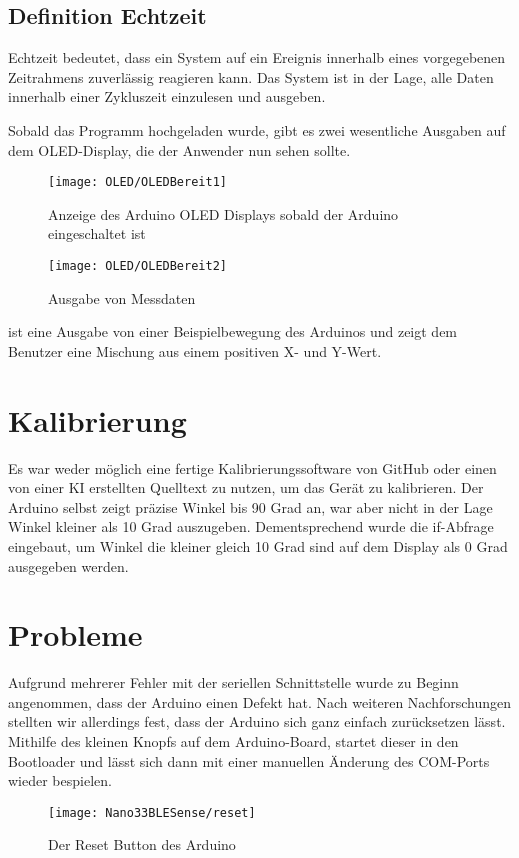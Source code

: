 \subsection{Definition Echtzeit}
\label{Echtzeit}
Echtzeit bedeutet, dass ein System auf ein Ereignis innerhalb eines vorgegebenen Zeitrahmens zuverlässig reagieren kann. Das System ist in der Lage, alle Daten innerhalb einer Zykluszeit einzulesen und ausgeben. \cite{Scholz:2005}


Sobald das Programm hochgeladen wurde, gibt es zwei wesentliche Ausgaben auf dem OLED-Display, die der Anwender nun sehen sollte.

\begin{figure}[H]
    \centering
    \texttt{[image: OLED/OLEDBereit1]}
    \caption{Anzeige des Arduino OLED Displays sobald der Arduino eingeschaltet ist}
\end{figure}

\begin{figure}[H]
    \centering
    \texttt{[image: OLED/OLEDBereit2]}
    \caption{Ausgabe von Messdaten}
\end{figure}

 ist eine Ausgabe von einer Beispielbewegung des Arduinos und zeigt dem Benutzer eine Mischung aus einem positiven X- und Y-Wert.




\section{Kalibrierung}

Es war weder möglich eine fertige Kalibrierungssoftware von GitHub oder einen von einer KI erstellten Quelltext zu nutzen, um das Gerät zu kalibrieren. Der Arduino selbst zeigt präzise Winkel bis 90 Grad an, war aber nicht in der Lage Winkel kleiner als 10 Grad auszugeben. Dementsprechend wurde die if-Abfrage eingebaut, um Winkel die kleiner gleich 10 Grad sind auf dem Display als 0 Grad ausgegeben werden.



\section{Probleme}

Aufgrund mehrerer Fehler mit der seriellen Schnittstelle wurde zu Beginn angenommen, dass der Arduino einen Defekt hat. Nach weiteren Nachforschungen stellten wir allerdings fest, dass der Arduino sich ganz einfach zurücksetzen lässt. Mithilfe des kleinen Knopfs auf dem Arduino-Board, startet dieser in den Bootloader und lässt sich dann mit einer manuellen Änderung des COM-Ports wieder bespielen.

\begin{figure}[H]
    \centering
    \texttt{[image: Nano33BLESense/reset]}
    \caption{Der Reset Button des Arduino}
\end{figure}





